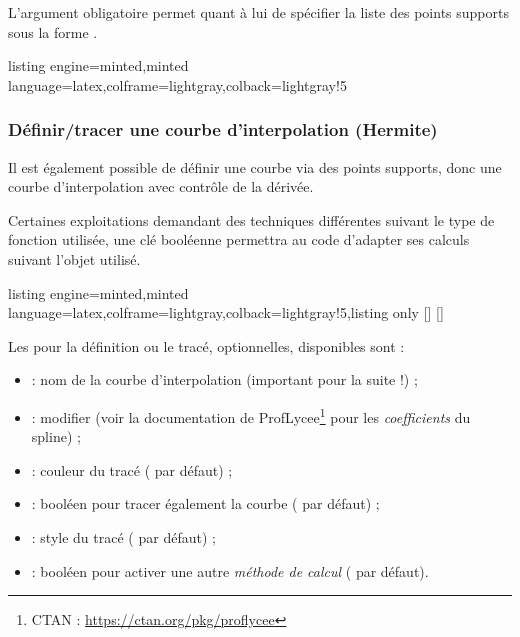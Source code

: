 \documentclass[11pt,a4paper]{ltxdoc}
\begin{document}
L'argument obligatoire permet quant à lui de spécifier la liste des points supports sous la forme .

\begin{tcblisting}{listing engine=minted,minted language=latex,colframe=lightgray,colback=lightgray!5}
\begin{GraphiqueTikz}%
  [x=0.8cm,y=1cm,Xmin=-7,Xmax=4,Ymin=-3,Ymax=5]
\end{GraphiqueTikz}
\end{tcblisting}

\newpage

\subsubsection{Définir/tracer une courbe d'interpolation (Hermite)}\label{deftracfctspline}

Il est également possible de définir une courbe via des points supports, donc une courbe d'interpolation avec contrôle de la dérivée.

\smallskip

Certaines exploitations demandant des techniques différentes suivant le type de fonction utilisée, une clé booléenne  permettra au code d'adapter ses calculs suivant l'objet utilisé.

\begin{tcblisting}{listing engine=minted,minted language=latex,colframe=lightgray,colback=lightgray!5,listing only}
[\macronomspline]
[\macronomspline]
\end{tcblisting}

Les \MontreCode{[clés]} pour la définition ou le tracé, optionnelles, disponibles sont :

\smallskip

\begin{itemize}
  \item {} : nom de la courbe d'interpolation (important pour la suite !) ;
  \item {} : modifier (voir la documentation de \textsf{ProfLycee}\footnote{CTAN : \url{https://ctan.org/pkg/proflycee}} pour les \textit{coefficients} du spline) ;
  \item {} : couleur du tracé ( par défaut) ;
  \item {} : booléen pour tracer également la courbe ( par défaut) ;
  \item {} : style du tracé ( par défaut) ;
  \item {} : booléen pour activer une autre \textit{méthode de calcul} ( par défaut).
\end{itemize}
\end{document}
